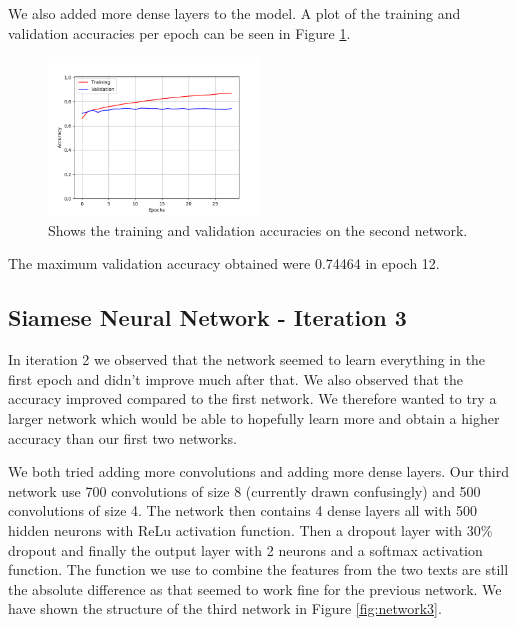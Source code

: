 We also added more dense layers to the model. A plot of the
training and validation accuracies per epoch can be seen in Figure
\ref{fig:network2_accuracies}.

\begin{figure}
    \centering
    \includegraphics[width=0.5\textwidth]{./pictures/experiments/network_2_accuracies.png}
    \caption{Shows the training and validation accuracies on the second
        network.}
    \label{fig:network2_accuracies}
\end{figure}

The maximum validation accuracy obtained were 0.74464 in epoch 12.


\subsection{Siamese Neural Network - Iteration 3}

In iteration 2 we observed that the network seemed to learn everything in the
first epoch and didn't improve much after that. We also observed that the
accuracy improved compared to the first network. We therefore wanted to try a
larger network which would be able to hopefully learn more and obtain a higher
accuracy than our first two networks.

We both tried adding more convolutions and adding more dense layers. Our third
network use 700 convolutions of size 8 (currently drawn confusingly) and 500
convolutions of size 4. The network then contains 4 dense layers all with 500
hidden neurons with \gls{ReLu} activation function. Then a dropout layer with
30\% dropout and finally the output layer with 2 neurons and a softmax
activation function. The function we use to combine the features from the two
texts are still the absolute difference as that seemed to work fine for the
previous network. We have shown the structure of the third network in Figure
\ref{fig:network3}.


